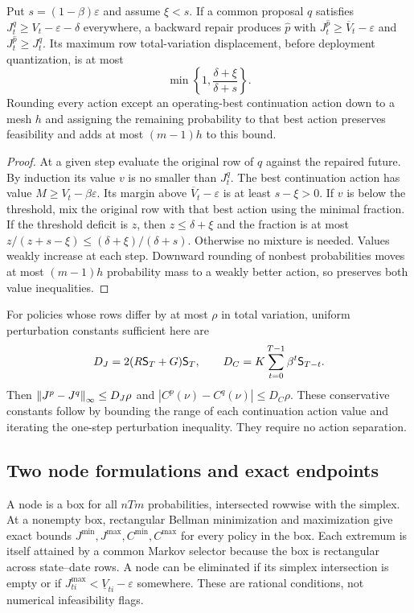 \begin{lemma}\label{lem:repair48}
Put $s=(1-\beta)\varepsilon$ and assume $\xi<s$. If a common proposal $q$ satisfies $J_t^q\ge V_t-\varepsilon-\delta$ everywhere, a backward repair produces $\widehat p$ with $J_t^{\widehat p}\ge\overline V_t-\varepsilon$ and $J_t^{\widehat p}\ge J_t^q$. Its maximum row total-variation displacement, before deployment quantization, is at most
\begin{equation}\label{eq:repair48}
 \min\left\{1,\frac{\delta+\xi}{\delta+s}\right\}.
\end{equation}
Rounding every action except an operating-best continuation action down to a mesh $h$ and assigning the remaining probability to that best action preserves feasibility and adds at most $(m-1)h$ to this bound.
\end{lemma}
\begin{proof}
At a given step evaluate the original row of $q$ against the repaired future. By induction its value $v$ is no smaller than $J_t^q$. The best continuation action has value $M\ge V_t-\beta\varepsilon$. Its margin above $\overline V_t-\varepsilon$ is at least $s-\xi>0$. If $v$ is below the threshold, mix the original row with that best action using the minimal fraction. If the threshold deficit is $z$, then $z\le\delta+\xi$ and the fraction is at most $z/(z+s-\xi)\le(\delta+\xi)/(\delta+s)$. Otherwise no mixture is needed. Values weakly increase at each step. Downward rounding of nonbest probabilities moves at most $(m-1)h$ probability mass to a weakly better action, so preserves both value inequalities.
\end{proof}

For policies whose rows differ by at most $\rho$ in total variation, uniform perturbation constants sufficient here are
\begin{equation}\label{eq:moduli48}
 D_J=2(R\mathsf S_{T}+G)\mathsf S_{T},\qquad
 D_C=K\sum_{t=0}^{T-1}\beta^t\mathsf S_{T-t}.
\end{equation}
Then $\left\|J^p-J^q\right\|_\infty\le D_J\rho$ and $|C^p(\nu)-C^q(\nu)|\le D_C\rho$. These conservative constants follow by bounding the range of each continuation action value and iterating the one-step perturbation inequality. They require no action separation.

\subsection{Two node formulations and exact endpoints}
A node is a box for all $nTm$ probabilities, intersected rowwise with the simplex. At a nonempty box, rectangular Bellman minimization and maximization give exact bounds $J^{\min},J^{\max},C^{\min},C^{\max}$ for every policy in the box. Each extremum is itself attained by a common Markov selector because the box is rectangular across state--date rows. A node can be eliminated if its simplex intersection is empty or if $J^{\max}_{ti}<\underline V_{ti}-\varepsilon$ somewhere. These are rational conditions, not numerical infeasibility flags.

